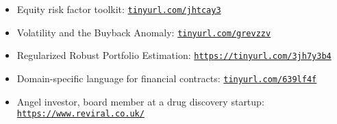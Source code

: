 \documentclass[11pt,oneside]{article}\usepackage[]{graphicx}\usepackage[]{xcolor}
\begin{document}
\begin{itemize}
  \item Equity risk factor toolkit:
  \href{http://tinyurl.com/jhtcay3}{\texttt{tinyurl.com/jhtcay3}}
  \item Volatility and the Buyback Anomaly:
  \href{http://tinyurl.com/grevzzv}{\texttt{tinyurl.com/grevzzv}}
  \item Regularized Robust Portfolio Estimation:
  \href{https://tinyurl.com/3jh7y3b4}{\texttt{https://tinyurl.com/3jh7y3b4}}
  \item Domain-specific language for financial contracts:
  \href{http://tinyurl.com/639lf4f}{\texttt{tinyurl.com/639lf4f}}
  \item Angel investor, board member at a drug discovery startup:
  \href{https://www.reviral.co.uk/}{\texttt{https://www.reviral.co.uk/}}  
\end{itemize}
\end{document}

